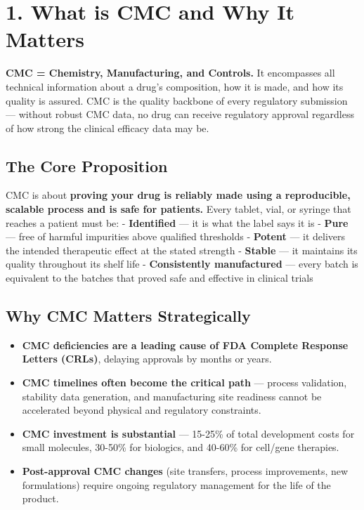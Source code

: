 \documentclass[
  11pt,
  a4paper,
]{report}
\providecommand{\tightlist}{%
  \setlength{\itemsep}{0pt}\setlength{\parskip}{0pt}}
\begin{document}
\hypertarget{what-is-cmc-and-why-it-matters}{%
\section{1. What is CMC and Why It
Matters}\label{what-is-cmc-and-why-it-matters}}

\textbf{CMC = Chemistry, Manufacturing, and Controls.} It encompasses
all technical information about a drug's composition, how it is made,
and how its quality is assured. CMC is the quality backbone of every
regulatory submission --- without robust CMC data, no drug can receive
regulatory approval regardless of how strong the clinical efficacy data
may be.

\hypertarget{the-core-proposition}{%
\subsection{The Core Proposition}\label{the-core-proposition}}

CMC is about \textbf{proving your drug is reliably made using a
reproducible, scalable process and is safe for patients.} Every tablet,
vial, or syringe that reaches a patient must be: - \textbf{Identified}
--- it is what the label says it is - \textbf{Pure} --- free of harmful
impurities above qualified thresholds - \textbf{Potent} --- it delivers
the intended therapeutic effect at the stated strength - \textbf{Stable}
--- it maintains its quality throughout its shelf life -
\textbf{Consistently manufactured} --- every batch is equivalent to the
batches that proved safe and effective in clinical trials

\hypertarget{why-cmc-matters-strategically}{%
\subsection{Why CMC Matters
Strategically}\label{why-cmc-matters-strategically}}

\begin{itemize}
\tightlist
\item
  \textbf{CMC deficiencies are a leading cause of FDA Complete Response
  Letters (CRLs)}, delaying approvals by months or years.
\item
  \textbf{CMC timelines often become the critical path} --- process
  validation, stability data generation, and manufacturing site
  readiness cannot be accelerated beyond physical and regulatory
  constraints.
\item
  \textbf{CMC investment is substantial} --- 15-25\% of total
  development costs for small molecules, 30-50\% for biologics, and
  40-60\% for cell/gene therapies.
\item
  \textbf{Post-approval CMC changes} (site transfers, process
  improvements, new formulations) require ongoing regulatory management
  for the life of the product.
\end{itemize}
\end{document}
